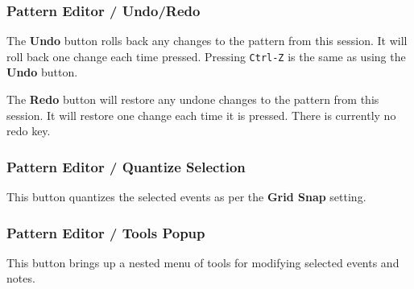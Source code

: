 
\subsubsection{Pattern Editor / Undo/Redo}
\label{subsubsec:pattern_editor_second_row_undo_redo}

   \setcounter{ItemCounter}{0}      %

   The \textbf{Undo} button rolls back any changes to the pattern from this
   session.  It will roll back one change each time pressed.
   Pressing \texttt{Ctrl-Z} is the same as using the \textbf{Undo} button.

   The \textbf{Redo} button will restore any undone changes to the pattern from
   this session.
   It will restore one change each time it is pressed.
   There is currently no redo key.

\subsubsection{Pattern Editor /  Quantize Selection}
\label{subsubsec:pattern_editor_second_row_quantize_selection}

   This button quantizes the selected events as per
   the \textbf{Grid Snap} setting.

\subsubsection{Pattern Editor / Tools Popup}
\label{subsubsec:pattern_editor_second_row_tools_popup}

   This button brings up a nested menu of tools for modifying selected
   events and notes.

